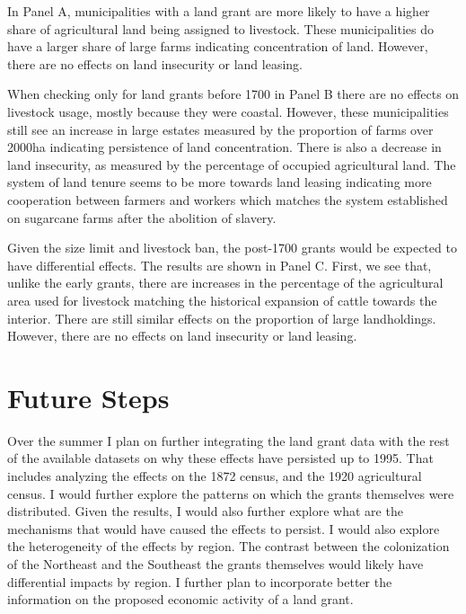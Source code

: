 \documentclass[11pt]{article}
\begin{document}
In Panel A, municipalities with a land grant are more likely to have a higher share of agricultural land being assigned to livestock. These municipalities do have a larger share of large farms indicating concentration of land. However, there are no effects on land insecurity or land leasing. 

When checking only for land grants before 1700 in Panel B there are no effects on livestock usage, mostly because they were coastal. However, these municipalities still see an increase in large estates measured by the proportion of farms over 2000ha indicating persistence of land concentration. There is also a decrease in land insecurity, as measured by the percentage of occupied agricultural land. The system of land tenure seems to be more towards land leasing indicating more cooperation between farmers and workers which matches the system established on sugarcane farms after the abolition of slavery.  

Given the size limit and livestock ban, the post-1700 grants would be expected to have differential effects. The results are shown in Panel C. First, we see that, unlike the early grants, there are increases in the percentage of the agricultural area used for livestock matching the historical expansion of cattle towards the interior. There are still similar effects on the proportion of large landholdings. However, there are no effects on land insecurity or land leasing. 

\section{Future Steps}

Over the summer I plan on further integrating the land grant data with the rest of the available datasets on why these effects have persisted up to 1995. 
That includes analyzing the effects on the 1872 census, and the 1920 agricultural census.
I would further explore the patterns on which the grants themselves were distributed. 
Given the results, I would also further explore what are the mechanisms that would have caused the effects to persist. 
I would also explore the heterogeneity of the effects by region. 
The contrast between the colonization of the Northeast and the Southeast the grants themselves would likely have differential impacts by region. 
I further plan to incorporate better the information on the proposed economic activity of a land grant. 






\clearpage


\printbibliography

\appendix
\end{document}
